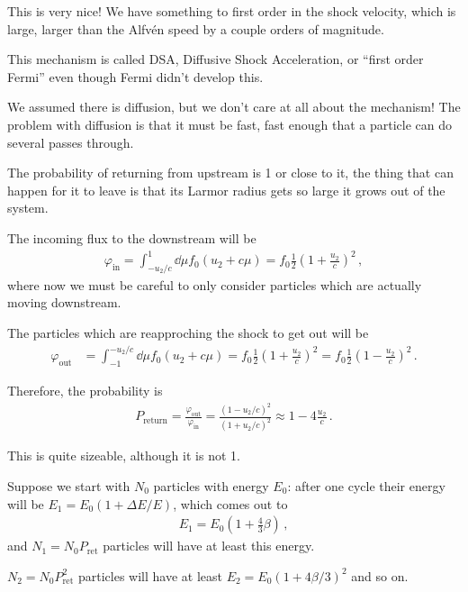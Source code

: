 \documentclass[main.tex]{subfiles}
\begin{document}
This is very nice! We have something to first order in the shock velocity, which is large, larger than the Alfvén speed by a couple orders of magnitude. 

This mechanism is called DSA, Diffusive Shock Acceleration, or ``first order Fermi'' even though Fermi didn't develop this. 

We assumed there is diffusion, but we don't care at all about the mechanism! 
The problem with diffusion is that it must be fast, fast enough that a particle can do several passes through. 

The probability of returning from upstream is 1 or close to it, the thing that can happen for it to leave is that its Larmor radius gets so large it grows out of the system. 

The incoming flux to the downstream will be 
%
\begin{align}
\varphi _{\text{in}} = \int_{- u_2 / c}^{1} \dd{\mu } f_0 (u_2 + c \mu )
= f_0 \frac{1}{2} \left(1 + \frac{u_2}{c}\right)^2
\,,
\end{align}
%
where now we must be careful to only consider particles which are actually moving downstream. 

The particles which are reapproching the shock to get out will be 
%
\begin{align}
\varphi _{\text{out}} &= \int_{-1}^{-u_2/c} \dd{\mu } f_0 (u_2 + c \mu )= f_0 \frac{1}{2} \left(1 + \frac{u_2}{c}\right)^2
= f_0 \frac{1}{2} \left(1 - \frac{u_2}{c}\right)^2
\,.
\end{align}

Therefore, the probability is 
%
\begin{align}
P _{\text{return}} = \frac{\varphi _{\text{out}}}{ \varphi _{\text{in}}} = \frac{(1 - u_2 / c)^2}{(1 + u_2 / c)^2} \approx 1 - 4 \frac{u_2}{c}
\,.
\end{align}

This is quite sizeable, although it is not 1. 


Suppose we start with \(N_0 \) particles with energy \(E_0 \): after one cycle their energy will be \(E_1 = E_0 (1 + \Delta E / E)\), which comes out to 
%
\begin{align}
E_1 = E_0 \left( 1 + \frac{4}{3} \beta \right)
\,,
\end{align}
%
and \(N_1 = N_0 P _{\text{ret}}\) particles will have at least this energy. 

\(N_2 = N_0 P _{\text{ret}}^2 \) particles will have at least \(E_2 = E_0 (1 + 4 \beta /3)^2\) and so on. 
\end{document}
